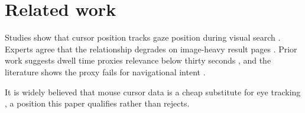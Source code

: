 \section{Related work}

Studies show that cursor position tracks gaze position during visual search
\cite{huang2012}. Experts agree that the relationship degrades on image-heavy
result pages \citep{navalpakkam2013}. Prior work suggests dwell time proxies
relevance below thirty seconds \citet{kim2014}, and the literature shows the
proxy fails for navigational intent \cite{liu2010,white2007}.

It is widely believed that mouse cursor data is a cheap substitute for eye
tracking \citeauthor{rodden2008}, a position this paper qualifies rather than
rejects.
